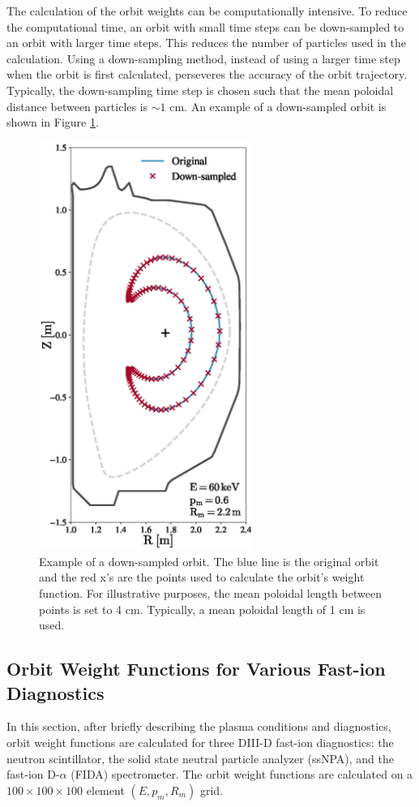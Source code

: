The calculation of the orbit weights can be computationally intensive. To reduce the computational time, an orbit with small time steps can be down-sampled to an orbit with larger time steps. This reduces the number of particles used in the calculation. Using a down-sampling method, instead of using a larger time step when the orbit is first calculated, perseveres the accuracy of the orbit trajectory. Typically, the down-sampling time step is chosen such that the mean poloidal distance between particles is $\sim1$ cm. An example of a down-sampled orbit is shown in Figure \ref{fig:down_sample}.
\begin{figure}[h!]
    \centering
    \includegraphics[width=7cm]{figures/down_sampled_orbit.eps}
    \caption{Example of a down-sampled orbit. The blue line is the original orbit and the red x's are the points used to calculate the orbit's weight function. For illustrative purposes, the mean poloidal length between points is set to 4 cm. Typically, a mean poloidal length of 1 cm is used.}
    \label{fig:down_sample}
\end{figure}

\subsection{Orbit Weight Functions for Various Fast-ion Diagnostics}
In this section, after briefly describing the plasma conditions and diagnostics,
orbit weight functions are calculated for three DIII-D fast-ion diagnostics: 
the neutron scintillator, the solid state neutral particle analyzer (ssNPA), and the fast-ion D-$\alpha$ (FIDA) spectrometer.
The orbit weight functions are calculated on a $100 \times 100 \times 100$ element 
$(E,p_m,R_m)$ grid.

